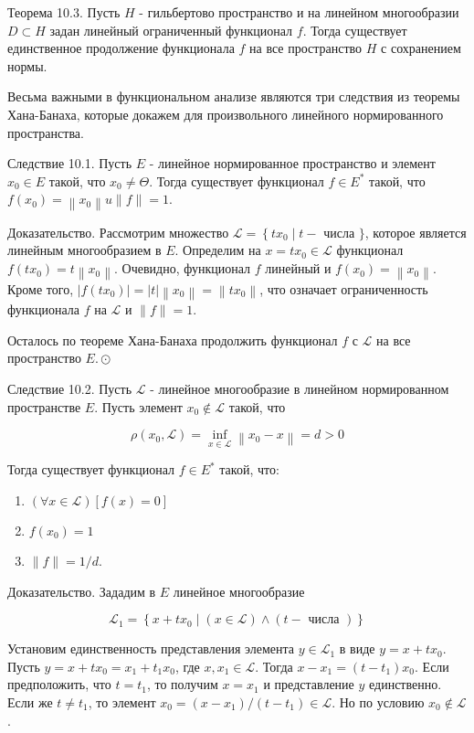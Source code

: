 Теорема 10.3. Пусть $H$ - гильбертово пространство и на линейном многообразии $D \subset H$ задан линейный ограниченный функционал $f$. Тогда существует единственное продолжение функционала $f$ на все пространство $H$ с сохранением нормы.

Весьма важными в функциональном анализе являются три следствия из теоремы Хана-Банаха, которые докажем для произвольного линейного нормированного пространства.

Следствие 10.1. Пусть $E$ - линейное нормированное пространство и элемент $x_{0} \in E$ такой, что $x_{0} \neq \Theta$. Тогда существует функционал $f \in E^{*}$ такой, что $f\left(x_{0}\right)=\left\|x_{0}\right\| u\|f\|=1$.

Доказательство. Рассмотрим множество $\mathcal{L}=\left\{t x_{0} \mid t-\right.$ числа $\}$, которое является линейным многообразием в $E$. Определим на $x=t x_{0} \in \mathcal{L}$ функционал $f\left(t x_{0}\right)=t\left\|x_{0}\right\|$. Очевидно, функционал $f$ линейный и $f\left(x_{0}\right)=\left\|x_{0}\right\|$. Кроме того, $\left|f\left(t x_{0}\right)\right|=|t|\left\|x_{0}\right\|=\left\|t x_{0}\right\|$, что означает ограниченность функционала $f$ на $\mathcal{L}$ и $\|f\|=1$.

Осталось по теореме Хана-Банаха продолжить функционал $f$ с $\mathcal{L}$ на все пространство $E . \odot$

Следствие 10.2. Пусть $\mathcal{L}$ - линейное многообразие в линейном нормированном пространстве $E$. Пусть элемент $x_{0} \notin \mathcal{L}$ такой, что

\[
\rho\left(x_{0}, \mathcal{L}\right)=\inf _{x \in \mathcal{L}}\left\|x_{0}-x\right\|=d>0
\]

Тогда существует функционал $f \in E^{*}$ такой, что:

\begin{enumerate}
  \item $(\forall x \in \mathcal{L})[f(x)=0]$
  \item $f\left(x_{0}\right)=1$
  \item $\|f\|=1 / d$.
\end{enumerate}

Доказательство. Зададим в $E$ линейное многообразие

\[
\mathcal{L}_{1}=\left\{x+t x_{0} \mid(x \in \mathcal{L}) \wedge(t-\text { числа })\right\}
\]

Установим единственность представления элемента $y \in \mathcal{L}_{1}$ в виде $y=x+t x_{0}$. Пусть $y=x+t x_{0}=x_{1}+t_{1} x_{0}$, где $x, x_{1} \in \mathcal{L}$. Тогда $x-x_{1}=\left(t-t_{1}\right) x_{0}$. Если предположить, что $t=t_{1}$, то получим $x=x_{1}$ и представление $y$ единственно. Если же $t \neq t_{1}$, то элемент $x_{0}=\left(x-x_{1}\right) /\left(t-t_{1}\right) \in \mathcal{L}$. Но по условию $x_{0} \notin \mathcal{L}$.

